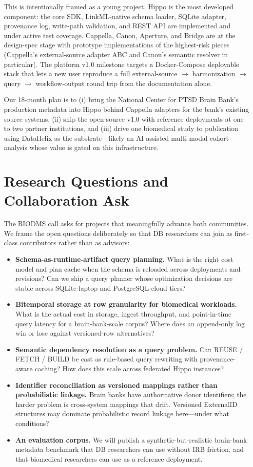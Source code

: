 \documentclass[sigconf, nonacm]{acmart}
\begin{document}
This is intentionally framed as a young project. Hippo is the most developed component: the core SDK, LinkML-native schema loader, SQLite adapter, provenance log, write-path validation, and REST API are implemented and under active test coverage. Cappella, Canon, Aperture, and Bridge are at the design-spec stage with prototype implementations of the highest-risk pieces (Cappella's external-source adapter ABC and Canon's semantic resolver in particular). The platform v1.0 milestone targets a Docker-Compose deployable stack that lets a new user reproduce a full external-source $\rightarrow$ harmonization $\rightarrow$ query $\rightarrow$ workflow-output round trip from the documentation alone.

Our 18-month plan is to (i) bring the National Center for PTSD Brain Bank's production metadata into Hippo behind Cappella adapters for the bank's existing source systems, (ii) ship the open-source v1.0 with reference deployments at one to two partner institutions, and (iii) drive one biomedical study to publication using DataHelix as the substrate---likely an AI-assisted multi-modal cohort analysis whose value is gated on this infrastructure.

\section{Research Questions and Collaboration Ask}

The BIODMS call asks for projects that meaningfully advance both communities. We frame the open questions deliberately so that DB researchers can join as first-class contributors rather than as advisors:

\begin{itemize}
\item \textbf{Schema-as-runtime-artifact query planning.} What is the right cost model and plan cache when the schema is reloaded across deployments and revisions? Can we ship a query planner whose optimization decisions are stable across SQLite-laptop and PostgreSQL-cloud tiers?
\item \textbf{Bitemporal storage at row granularity for biomedical workloads.} What is the actual cost in storage, ingest throughput, and point-in-time query latency for a brain-bank-scale corpus? Where does an append-only log win or lose against versioned-row alternatives?
\item \textbf{Semantic dependency resolution as a query problem.} Can REUSE / FETCH / BUILD be cast as rule-based query rewriting with provenance-aware caching? How does this scale across federated Hippo instances?
\item \textbf{Identifier reconciliation as versioned mappings rather than probabilistic linkage.} Brain banks have authoritative donor identifiers; the harder problem is cross-system mappings that drift. Versioned ExternalID structures may dominate probabilistic record linkage here---under what conditions?
\item \textbf{An evaluation corpus.} We will publish a synthetic-but-realistic brain-bank metadata benchmark that DB researchers can use without IRB friction, and that biomedical researchers can use as a reference deployment.
\end{itemize}
\end{document}

